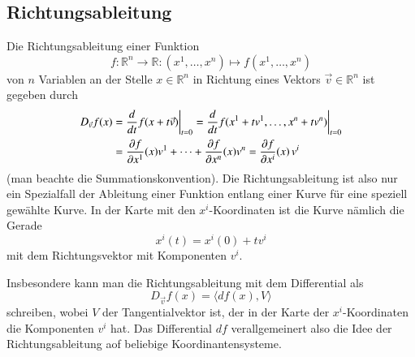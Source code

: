 \subsection{Richtungsableitung}
Die Richtungsableitung einer Funktion 
%
\[
f\colon
\mathbb{R}^n\to\mathbb{R}
:
(x^1,\dots,x^n)\mapsto f(x^1,\dots,x^n)
\]
von $n$ Variablen an der Stelle $x\in\mathbb{R}^n$ in Richtung
eines Vektors $\vec{v}\in\mathbb{R}^n$ ist gegeben durch
\begin{align}
D_{\vec{v}}f(x)
&=
\frac{d}{dt}
f(x+t\vec{v})
\bigg|_{t=0}
=
\frac{d}{dt}
f(x^1+tv^1,\dots,x^n+tv^n)\bigg|_{t=0}
\notag
\\
&=
\frac{\partial f}{\partial x^1}(x)v^1
+
\dots
+
\frac{\partial f}{\partial x^n}(x)v^n
=
\frac{\partial f}{\partial x^i}(x)\,v^i
\label{buch:kurvenintegral:differential:eqn:ricthungsableitung}
\end{align}
(man beachte die Summationskonvention).
Die Richtungsableitung ist also nur ein Spezialfall der Ableitung
einer Funktion entlang einer Kurve für eine speziell gewählte
Kurve.
In der Karte mit den $x^i$-Koordinaten ist die Kurve nämlich die Gerade
\[
x^i(t) = x^i(0) + tv^i
\]
mit dem Richtungsvektor mit Komponenten $v^i$.
%

Insbesondere kann man die Richtungsableitung mit dem Differential
als
\[
D_{\vec{v}}f(x)
=
\langle
df(x),
V
\rangle
\]
schreiben, wobei $V$ der Tangentialvektor ist, der in der Karte
der $x^i$-Koordinaten die Komponenten $v^i$ hat.
Das Differential $df$ verallgemeinert also die Idee der 
Richtungsableitung aof beliebige Koordinantensysteme.


%
%
